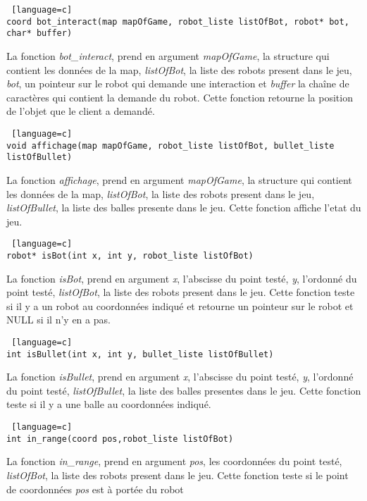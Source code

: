 \documentclass[a4paper, 11pt]{article}
\begin{document}
\begin {lstlisting} [language=c]
coord bot_interact(map mapOfGame, robot_liste listOfBot, robot* bot, char* buffer)
\end{lstlisting}
La fonction \emph{bot\_interact}, prend en argument \emph{mapOfGame}, la structure qui contient les données de la map, \emph{listOfBot}, la liste des robots present dans le jeu, \emph{bot}, un pointeur sur le robot qui demande une interaction et \emph{buffer} la chaîne de caractères qui contient la demande du robot. Cette fonction retourne la position de l'objet que le client a demandé.\\

\begin {lstlisting} [language=c]
void affichage(map mapOfGame, robot_liste listOfBot, bullet_liste listOfBullet)
\end{lstlisting}
La fonction \emph{affichage}, prend en argument \emph{mapOfGame}, la structure qui contient les données de la map, \emph{listOfBot}, la liste des robots present dans le jeu, \emph{listOfBullet}, la liste des balles presente dans le jeu. Cette fonction affiche l'etat du jeu.\\

\begin {lstlisting} [language=c]
robot* isBot(int x, int y, robot_liste listOfBot)
\end{lstlisting}
La fonction \emph{isBot}, prend en argument \emph{x}, l'abscisse du point testé, \emph{y}, l'ordonné du point testé, \emph{listOfBot}, la liste des robots present dans le jeu. Cette fonction teste si il y a un robot au coordonnées indiqué et retourne un pointeur sur le robot et NULL si il n'y en a pas.\\

\begin {lstlisting} [language=c]
int isBullet(int x, int y, bullet_liste listOfBullet)
\end{lstlisting}
La fonction \emph{isBullet}, prend en argument \emph{x}, l'abscisse du point testé, \emph{y}, l'ordonné du point testé, \emph{listOfBullet}, la liste des balles presentes dans le jeu. Cette fonction teste si il y a une balle au coordonnées indiqué.\\

\begin {lstlisting} [language=c]
int in_range(coord pos,robot_liste listOfBot)
\end{lstlisting}
La fonction \emph{in\_range}, prend en argument \emph{pos}, les coordonnées du point testé, \emph{listOfBot}, la liste des robots present dans le jeu. Cette fonction teste si le point de coordonnées \emph{pos} est à portée du robot\\
\end{document}
